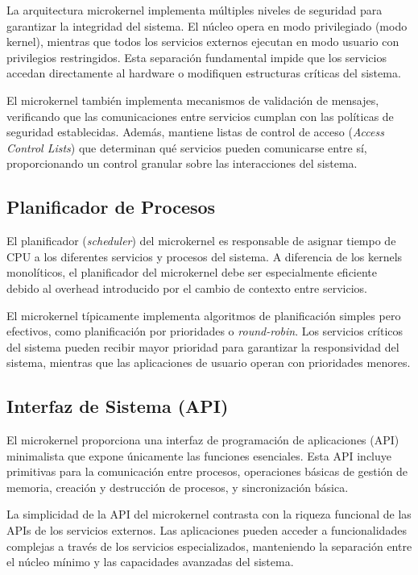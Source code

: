 \documentclass[12pt,a4paper]{article}
\begin{document}
La arquitectura microkernel implementa múltiples niveles de seguridad para garantizar la integridad del sistema. El núcleo opera en modo privilegiado (modo kernel), mientras que todos los servicios externos ejecutan en modo usuario con privilegios restringidos. Esta separación fundamental impide que los servicios accedan directamente al hardware o modifiquen estructuras críticas del sistema.

El microkernel también implementa mecanismos de validación de mensajes, verificando que las comunicaciones entre servicios cumplan con las políticas de seguridad establecidas. Además, mantiene listas de control de acceso (\textit{Access Control Lists}) que determinan qué servicios pueden comunicarse entre sí, proporcionando un control granular sobre las interacciones del sistema.

\subsection{Planificador de Procesos}

El planificador (\textit{scheduler}) del microkernel es responsable de asignar tiempo de CPU a los diferentes servicios y procesos del sistema. A diferencia de los kernels monolíticos, el planificador del microkernel debe ser especialmente eficiente debido al overhead introducido por el cambio de contexto entre servicios.

El microkernel típicamente implementa algoritmos de planificación simples pero efectivos, como planificación por prioridades o \textit{round-robin}. Los servicios críticos del sistema pueden recibir mayor prioridad para garantizar la responsividad del sistema, mientras que las aplicaciones de usuario operan con prioridades menores.

\subsection{Interfaz de Sistema (API)}

El microkernel proporciona una interfaz de programación de aplicaciones (API) minimalista que expone únicamente las funciones esenciales. Esta API incluye primitivas para la comunicación entre procesos, operaciones básicas de gestión de memoria, creación y destrucción de procesos, y sincronización básica.

La simplicidad de la API del microkernel contrasta con la riqueza funcional de las APIs de los servicios externos. Las aplicaciones pueden acceder a funcionalidades complejas a través de los servicios especializados, manteniendo la separación entre el núcleo mínimo y las capacidades avanzadas del sistema.
\end{document}
